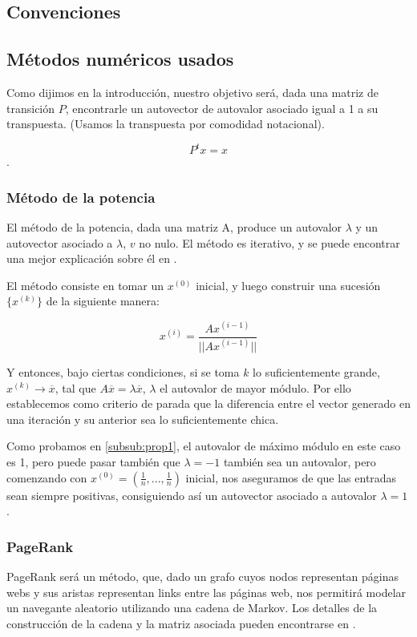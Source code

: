 \subsection{Convenciones}

\subsection{Métodos numéricos usados}

Como dijimos en la introducción, nuestro objetivo será, dada una matriz de transición $P$, encontrarle un autovector de autovalor asociado igual a 1 a su transpuesta. (Usamos la transpuesta por comodidad notacional).

\[P^t x = x\].

\subsubsection{Método de la potencia}
El método de la potencia, dada una matriz A, produce un autovalor $\lambda$ y un autovector asociado a $\lambda$, $v$ no nulo. El método es iterativo, y se puede encontrar una mejor explicación sobre él en \cite[Cap. 5.8.1]{dahlquist}. 

El método consiste en tomar un $x^{(0)}$ inicial, y luego construir una sucesión $\{x^{(k)}\}$ de la siguiente manera:

\[x^{(i)} = \frac{A x^{(i-1)}}{||A x^{(i-1)}||}\]

Y entonces, bajo ciertas condiciones, si se toma $k$ lo suficientemente grande, $x^{(k)} \to \overline{x}$, tal que $A\overline{x} = \lambda \overline{x}$, $\lambda$ el autovalor de mayor módulo. Por ello establecemos como criterio de parada que la diferencia entre el vector generado en una iteración y su anterior sea lo suficientemente chica.

Como probamos en \ref{subsub:prop1}, el autovalor de máximo módulo en este caso es 1, pero puede pasar también que $\lambda = -1$ también sea un autovalor, pero comenzando con $x^{(0)} = (\frac1n,..., \frac1n)$ inicial, nos aseguramos de que las entradas sean siempre positivas, consiguiendo así un autovector asociado a autovalor $\lambda = 1$.

\subsubsection{PageRank}
PageRank será un método, que, dado un grafo cuyos nodos representan páginas webs y sus aristas representan links entre las páginas web, nos permitirá modelar un navegante aleatorio utilizando una cadena de Markov. 
Los detalles de la construcción de la cadena y la matriz asociada pueden encontrarse en \cite{Brin1998}.

